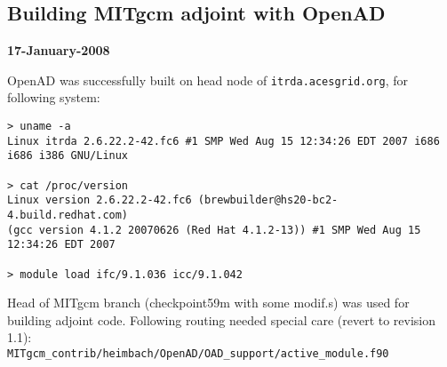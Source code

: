 \subsection{Building MITgcm adjoint with OpenAD}

\textbf{17-January-2008} 

OpenAD was successfully built on head node of
\texttt{itrda.acesgrid.org}, for following system:

\begin{verbatim}
> uname -a
Linux itrda 2.6.22.2-42.fc6 #1 SMP Wed Aug 15 12:34:26 EDT 2007 i686 i686 i386 GNU/Linux

> cat /proc/version 
Linux version 2.6.22.2-42.fc6 (brewbuilder@hs20-bc2-4.build.redhat.com) 
(gcc version 4.1.2 20070626 (Red Hat 4.1.2-13)) #1 SMP Wed Aug 15 12:34:26 EDT 2007

> module load ifc/9.1.036 icc/9.1.042
\end{verbatim}

Head of MITgcm branch (checkpoint59m with some modif.s) was used for building
adjoint code.
Following routing needed special care (revert to revision 1.1):
\\
\texttt{MITgcm\_contrib/heimbach/OpenAD/OAD\_support/active\_module.f90 }


